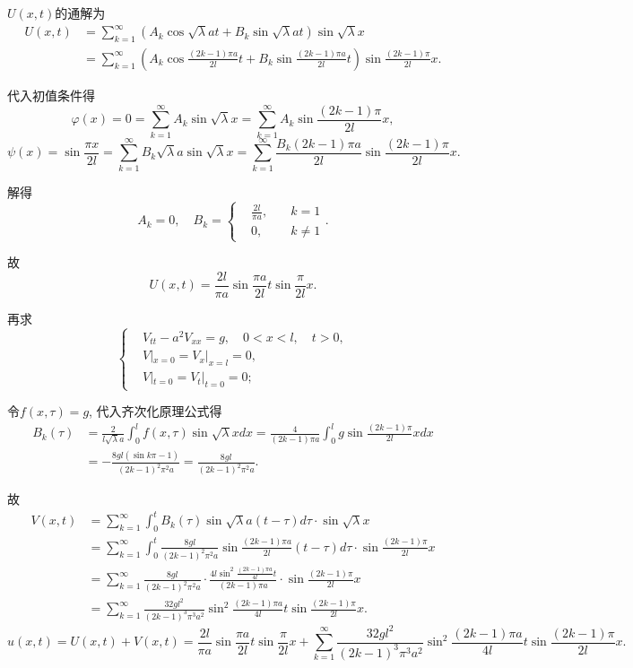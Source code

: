 \documentclass[11pt,a4paper]{article}
\begin{document}
$U(x,t)$的通解为
\begin{align*}
  U(x,t)
   & =\sum_{k=1}^\infty\left(A_k\cos\sqrt{\lambda}at+
  B_k\sin\sqrt{\lambda}at\right)\sin\sqrt{\lambda}x          \\
   & =\sum_{k=1}^\infty\left(A_k\cos\frac{(2k-1)\pi a}{2l}t+
  B_k\sin\frac{(2k-1)\pi a}{2l}t\right)\sin\frac{(2k-1)\pi}{2l}x.
\end{align*}

代入初值条件得
$$\varphi(x)=0=\sum_{k=1}^\infty A_k\sin\sqrt{\lambda}x=\sum_{k=1}^\infty A_k\sin\frac{(2k-1)\pi }{2l}x,$$
$$\psi(x)=\sin\frac{\pi x}{2l}=\sum_{k=1}^\infty B_k\sqrt{\lambda}a\sin\sqrt{\lambda}x=\sum_{k=1}^\infty \frac{B_k(2k-1)\pi a}{2l}\sin\frac{(2k-1)\pi}{2l}x.$$

解得
$$A_k=0,\quad B_k=\left\{\begin{aligned}&\frac{2l}{\pi a}, &\quad k = 1 \\& 0, &\quad k\neq 1 \end{aligned}\right..$$

故
$$U(x,t)=\frac{2l}{\pi a}\sin\frac{\pi a}{2l}t\sin\frac{\pi}{2l}x.$$

再求
$$
  \left\{\begin{aligned}
     & V_{tt}-a^2V_{xx}=g, \quad 0<x<l,\quad t>0, \\
     & V|_{x=0}=V_x|_{x=l}=0,                     \\
     & V|_{t=0}=V_t|_{t=0}=0;
  \end{aligned}\right.
$$

令$f(x,\tau)=g$, 代入齐次化原理公式得
\begin{align*}
  B_k(\tau)
   & =\frac{2}{l\sqrt{\lambda}a}\int_0^lf(x,\tau)\sin\sqrt{\lambda}xdx=\frac{4}{(2k-1)\pi a}\int_0^lg\sin\frac{(2k-1)\pi}{2l}xdx \\
   & =-\frac{8gl(\sin k\pi -1)}{(2k-1)^2\pi^2a}=\frac{8gl}{(2k-1)^2\pi^2a}.
\end{align*}

故
\begin{align*}
  V(x,t) & =\sum_{k=1}^\infty\int_0^t B_k(\tau)\sin\sqrt{\lambda}a(t-\tau)d\tau\cdot\sin\sqrt{\lambda}x                                       \\
         & =\sum_{k=1}^\infty\int_0^t \frac{8gl}{(2k-1)^2\pi^2a}\sin\frac{(2k-1)\pi a}{2l}(t-\tau)d\tau\cdot\sin\frac{(2k-1)\pi}{2l}x         \\
         & =\sum_{k=1}^\infty\frac{8gl}{(2k-1)^2\pi^2a}\cdot\frac{4l\sin^2\frac{(2k-1)\pi a}{4l}t}{(2k-1)\pi a}\cdot\sin\frac{(2k-1)\pi}{2l}x \\
         & =\sum_{k=1}^\infty\frac{32gl^2}{(2k-1)^3\pi^3a^2}\sin^2\frac{(2k-1)\pi a}{4l}t\sin\frac{(2k-1)\pi}{2l}x.
\end{align*}
$$u(x,t)=U(x,t)+V(x,t)=\frac{2l}{\pi a}\sin\frac{\pi a}{2l}t\sin\frac{\pi}{2l}x+\sum_{k=1}^\infty\frac{32gl^2}{(2k-1)^3\pi^3a^2}\sin^2\frac{(2k-1)\pi a}{4l}t\sin\frac{(2k-1)\pi}{2l}x.$$
\end{document}
